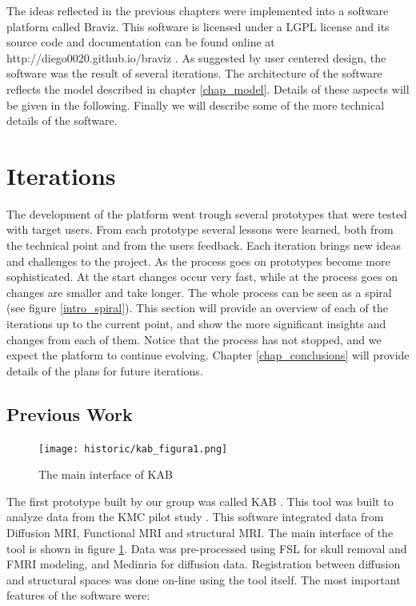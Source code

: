 
The ideas reflected in the previous chapters were implemented into a software platform called Braviz. This software is licensed under a LGPL license and its source code and documentation can be found online at http://diego0020.github.io/braviz . As suggested by user centered design, the software was the result of several iterations. The architecture of the software reflects the model described in chapter \ref{chap_model}. Details of these aspects will be given in the following. Finally we will describe some of the more technical details of the software.

\section{Iterations}
\label{sec_iterations}



The development of the platform went trough several prototypes that were tested with target users. From each prototype several lessons were learned, both from the technical point and from the users feedback. Each iteration brings new ideas and challenges to the project. As the process goes on prototypes become more sophisticated. At the start changes occur very fast, while at the process goes on changes are smaller and take longer. The whole process can be seen as a spiral (see figure \ref{intro_spiral}). This section will provide an overview of each of the iterations up to the current point, and show the more significant insights and changes from each of them. Notice that the process has not stopped, and we expect the platform to continue evolving. Chapter \ref{chap_conclusions} will provide details of the plans for future iterations.

\subsection{Previous Work}
\label{sec_kab}
\begin{figure}
\centering
\texttt{[image: historic/kab\_figura1.png]} 
\caption{\label{fig_kab}The main interface of KAB}
\end{figure}

The first prototype built by our group was called KAB \autocite{castro_kab:_2012}. This tool was built to analyze data from the KMC pilot study \autocite{schneider_cerebral_2012}. This software integrated data from Diffusion MRI, Functional MRI and structural MRI. The main interface of the tool is shown in figure \ref{fig_kab}. Data was pre-processed using FSL \autocite{jenkinson_fsl_2012} for skull removal and FMRI modeling, and Medinria \autocite{toussaint_medinria:_2007} for diffusion data. Registration between diffusion and structural spaces was done on-line using the tool itself. The most important features of the software were:

